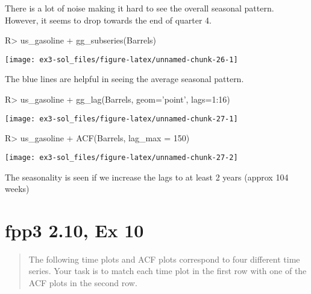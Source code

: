 \documentclass[
]{article}
\begin{document}
There is a lot of noise making it hard to see the overall seasonal pattern. However, it seems to drop towards the end of quarter 4.

\begin{CodeChunk}
\begin{CodeInput}
R> us_gasoline %
+   gg_subseries(Barrels)
\end{CodeInput}


\begin{center}\texttt{[image: ex3-sol\_files/figure-latex/unnamed-chunk-26-1]} \end{center}

\end{CodeChunk}

The blue lines are helpful in seeing the average seasonal pattern.

\begin{CodeChunk}
\begin{CodeInput}
R> us_gasoline %
+   gg_lag(Barrels, geom='point', lags=1:16)
\end{CodeInput}


\begin{center}\texttt{[image: ex3-sol\_files/figure-latex/unnamed-chunk-27-1]} \end{center}

\begin{CodeInput}
R> us_gasoline %
+   ACF(Barrels, lag_max = 150) %
\end{CodeInput}


\begin{center}\texttt{[image: ex3-sol\_files/figure-latex/unnamed-chunk-27-2]} \end{center}

\end{CodeChunk}

The seasonality is seen if we increase the lags to at least 2 years (approx 104 weeks)

\hypertarget{fpp3-2.10-ex-10}{%
\section{fpp3 2.10, Ex 10}\label{fpp3-2.10-ex-10}}

\begin{quote}
The following time plots and ACF plots correspond to four different time series. Your task is to match each time plot in the first row with one of the ACF plots in the second row.
\end{quote}
\end{document}
